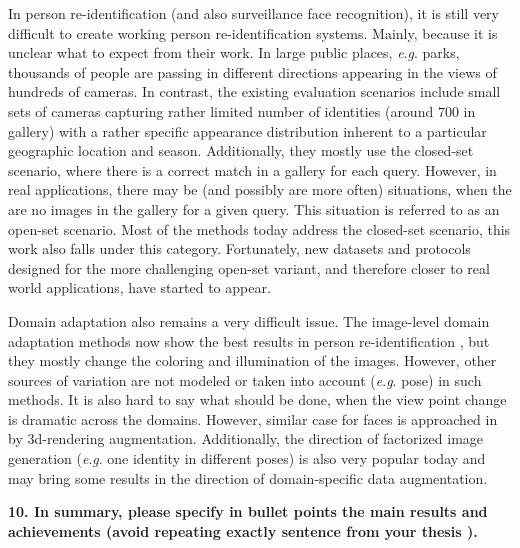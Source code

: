 \documentclass[a4paper, 11pt, oneside]{Thesis}  %
\newcommand{\eg}{\textit{e}.\textit{g}.}
\begin{document}
In person re-identification (and also surveillance face recognition), it is still very difficult to create working person re-identification systems. Mainly, because it is unclear what to expect from their work. In large public places, \eg{} parks, thousands of people are passing in different directions appearing in the views of hundreds of cameras. In contrast, the existing evaluation scenarios include small sets of cameras capturing rather limited number of identities (around $700$ in gallery) with a rather specific appearance distribution inherent to a particular geographic location and season. Additionally, they mostly use the closed-set scenario, where there is a correct match in a gallery for each query. However, in real applications, there may be (and possibly are more often) situations, when the are no images in the gallery for a given query. This situation is referred to as an open-set scenario. Most of the methods today address the closed-set scenario, this work also falls under this category. Fortunately, new datasets and protocols designed for the more challenging open-set variant, and therefore closer to real world applications, have started to appear.

Domain adaptation also remains a very difficult issue. The image-level domain adaptation methods now show the best results in person re-identification \citep{deng2018image}, but they mostly change the coloring and illumination of the images. However, other sources of variation are not modeled or taken into account (\eg{} pose) in such methods. It is also hard to say what should be done, when the view point change is dramatic across the domains. However, similar case for faces is approached in \cite{HongIRY17} by 3d-rendering augmentation. Additionally, the direction of factorized image generation (\eg{} one identity in different poses) is also very popular today and may bring some results in the direction of domain-specific data augmentation. 



\bigskip\ident\textbf{
10. In summary, please specify in bullet points the main results
and achievements (avoid repeating exactly sentence from your thesis ).}
\end{document}
